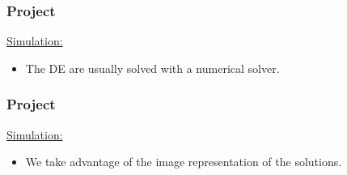 \documentclass[18pt]{beamer}
\begin{document}
\begin{frame}[t]
  \frametitle{Project}
  \begin{center}
    \large{\underline{Simulation:}}
  \end{center}
  \begin{figure}[htb]
    
  \end{figure}
  \vspace{0.7cm}  
  \begin{itemize}
  \item The DE are usually solved with a numerical solver.
  \end{itemize}  
\end{frame}

\begin{frame}[t]
  \frametitle{Project}
  \begin{center}
    \large{\underline{Simulation:}}
  \end{center}
  \begin{figure}[htb]
    
  \end{figure}
  \vspace{0.3cm}  
  \begin{itemize}
  \item We take advantage of the image representation of the solutions.
  \end{itemize}  
\end{frame}
\end{document}
